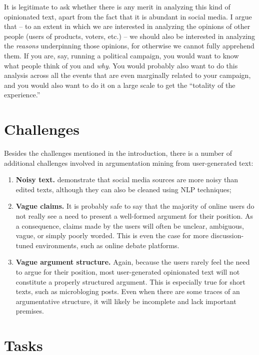 \documentclass[11pt]{article}
\begin{document}
It is legitimate to ask whether there is any merit in analyzing this kind of
opinionated text, apart from the fact that it is abundant in social media. I
argue that -- to an extent in which we are interested in analyzing the opinions
of other people (users of products, voters, etc.) -- we should also be
interested in analyzing the \emph{reasons} underpinning those opinions, for
otherwise we cannot fully apprehend them. If you are, say, running a political
campaign, you would want to know what people think of you and \emph{why}. You
would probably also want to do this analysis across all the events that are
even marginally related to your campaign, and you would also want to do it on a
large scale to get the ``totality of the experience.''

\section{Challenges}

Besides the challenges mentioned in the introduction, there is a number of
additional challenges involved in argumentation mining from user-generated
text:

\begin{enumerate}
\item \textbf{Noisy text.}  demonstrate that social media sources are more noisy than edited texts, although they can also be cleaned using NLP techniques;

\item \textbf{Vague claims.} It is  probably safe to say that the majority of
online users do not really see a need to present a well-formed argument for
their position.   As a consequence, claims made by the
users will often be unclear, ambiguous, vague, or simply poorly worded.  This is
even the case for more discussion-tuned environments, such as online debate
platforms.

\item \textbf{Vague argument structure.} Again, because the users rarely feel
the need to argue for their position, most user-generated opinionated text will
not constitute a properly structured argument. This is especially true for
short texts, such as microbloging posts. Even when there are some traces of an argumentative
structure, it will likely be incomplete and lack important premises.

\end{enumerate}


\section{Tasks}
\end{document}
